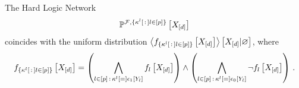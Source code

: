 \begin{theorem}
    The Hard Logic Network
    \begin{align*}
        \mathbb{P}^{\mathcal{F},\{\kappa^{l}\left[\,:\,\right]l\in[p]\}}\left[X_{[d]}\right]
    \end{align*}
    coincides with the uniform distribution $\left\langle f_{\{\kappa^{l}\left[\,:\,\right]l\in[p]\}}\left[X_{[d]}\right]\right\rangle \left[ X_{[d]} | \varnothing \right]$, where
    \begin{align*}
        f_{\{\kappa^{l}\left[\,:\,\right]l\in[p]\}}\left[X_{[d]}\right] =
        \left(\bigwedge_{l\in[p]\,:\,\kappa^{l}\left[=\right]\epsilon_1\left[Y_{l}\right]} f_{l}\left[X_{[d]}\right]\right)
        \land
        \left(\bigwedge_{l\in[p]\,:\,\kappa^{l}\left[=\right]\epsilon_0\left[Y_{l}\right]} \lnot f_{l}\left[X_{[d]}\right]\right) \, .
    \end{align*}
\end{theorem}
